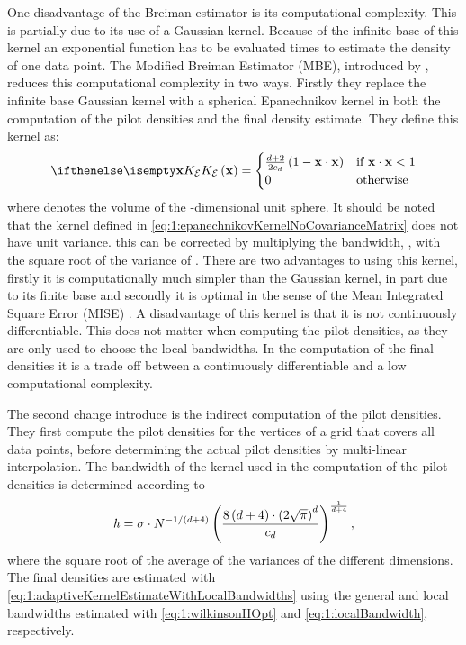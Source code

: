 	One disadvantage of the Breiman estimator is its computational complexity. This is partially due to its use of a Gaussian kernel. Because of the infinite base of this kernel an exponential function has to be evaluated \varNumPatterns times to estimate the density of one data point. 
	The Modified Breiman Estimator (MBE), introduced by \textcite{wilkinson1995dataplot}, reduces this computational complexity in two ways. Firstly they replace the infinite base Gaussian kernel with a spherical Epanechnikov kernel in both the computation of the pilot densities and the final density estimate. They define this kernel as:
	\begin{equation}\label{eq:1:epanechnikovKernelNoCovarianceMatrix}
		\varKernel[\varEpan]{\varPattern} = 
		\begin{cases}
			\frac{\varDim + 2}{2\varUnitSphere{\varDim}} \left( 1 - \varPattern \cdot \varPattern \right) & \text{if } \varPattern \cdot \varPattern < 1\\
			0 & \text{otherwise}
		\end{cases}
	\end{equation}
	 where \varUnitSphere{\varDim} denotes the volume of the \varDim-dimensional unit sphere. It should be noted that the kernel defined in \cref{eq:1:epanechnikovKernelNoCovarianceMatrix} does not have unit variance. this can be corrected by multiplying the bandwidth, \varBandwidth,  with the square root of the variance of \varKernel[\varEpan]{}. There are two advantages to using this kernel, firstly it is computationally much simpler than the Gaussian kernel, in part due to its finite base and secondly it is optimal in the sense of the Mean Integrated Square Error (MISE) \cite{epanechnikov1969non}. A disadvantage of this kernel is that it is not continuously differentiable. This does not matter when computing the pilot densities, as they are only used to choose the local bandwidths. In the computation of the final densities it is a trade off between a continuously differentiable \varEstimatedDensityFunction{} and a low computational complexity.

	The second change \textcite{wilkinson1995dataplot} introduce is the indirect computation of the pilot densities. They first compute the pilot densities for the vertices of a grid that covers all data points, before determining the actual pilot densities by multi-linear interpolation.
	The bandwidth of the kernel used in the computation of the pilot densities is determined according to
		\begin{equation}\label{eq:1:wilkinsonHOpt}
			\mathit{h} = 
			\sigma \cdot N^{{-1}/{\left(d +  4\right)}}
			\left(\frac{8\left(d + 4\right) \cdot \left(2 \sqrt{\pi}\right)^d}{c_{d}}\right)^{\frac{1}{d + 4}},
		\end{equation}
	where \varWilkinsonConstant the square root of the average of the variances of the different dimensions. The final densities are estimated with \cref{eq:1:adaptiveKernelEstimateWithLocalBandwidths} using the general and local bandwidths estimated with \cref{eq:1:wilkinsonHOpt} and \eqref{eq:1:localBandwidth}, respectively. 


